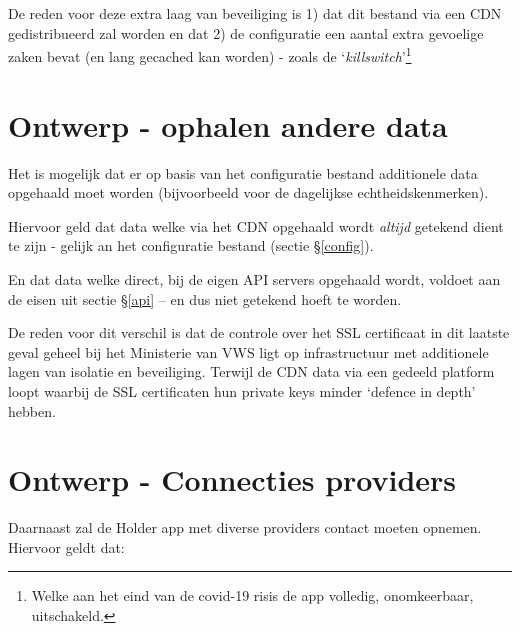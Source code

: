 \documentclass[11.0pt,twoside,openright]{report}
\begin{document}
De reden voor deze extra laag van beveiliging is 1) dat dit bestand via een CDN gedistribueerd zal worden en dat 2) de configuratie een aantal extra gevoelige zaken bevat (en lang gecached kan worden) - zoals de `\emph{killswitch}'\footnote{Welke aan het eind van de covid-19 risis de app volledig, onomkeerbaar, uitschakeld.}

\section{Ontwerp - ophalen andere data}

Het is mogelijk dat er op basis van het configuratie bestand additionele data opgehaald moet worden (bijvoorbeeld voor de dagelijkse echtheidskenmerken).

Hiervoor geld dat data welke via het CDN opgehaald wordt \emph{altijd} getekend dient te zijn - gelijk an het configuratie bestand (sectie \S\ref{config}).

En dat data welke direct, bij de eigen API servers opgehaald wordt, voldoet aan de eisen uit sectie \S\ref{api} -- en dus niet getekend hoeft te worden.

De reden voor dit verschil is dat de controle over het SSL certificaat in dit laatste geval geheel bij het Ministerie van VWS ligt op infrastructuur met additionele lagen van isolatie en beveiliging. Terwijl de CDN data via een gedeeld platform loopt waarbij de SSL certificaten hun private keys minder `defence in depth' hebben.

\pagebreak
\section{Ontwerp - Connecties providers}

Daarnaast zal de Holder app met diverse providers contact moeten opnemen. Hiervoor geldt dat:
\end{document}
